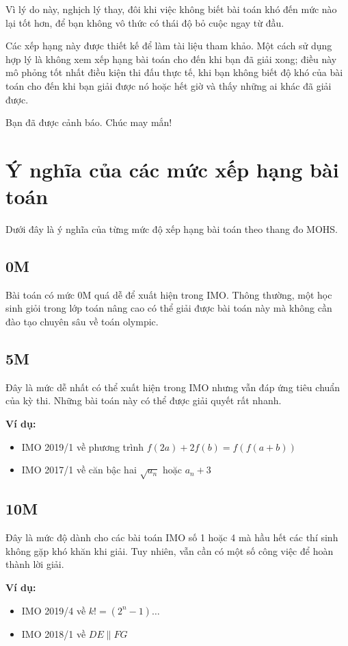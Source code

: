 \documentclass[../imo-training-open-book.tex]{subfiles}
\begin{document}
Vì lý do này, nghịch lý thay, đôi khi việc không biết bài toán khó đến mức nào lại tốt hơn,
để bạn không vô thức có thái độ bỏ cuộc ngay từ đầu.

Các xếp hạng này được thiết kế để làm tài liệu tham khảo. Một cách sử dụng hợp lý là không xem xếp hạng bài toán cho đến khi bạn đã giải xong;
điều này mô phỏng tốt nhất điều kiện thi đấu thực tế,
khi bạn không biết độ khó của bài toán cho đến khi bạn giải được nó hoặc hết giờ và thấy những ai khác đã giải được.

Bạn đã được cảnh báo. Chúc may mắn!

\section*{Ý nghĩa của các mức xếp hạng bài toán}

Dưới đây là ý nghĩa của từng mức độ xếp hạng bài toán theo thang đo MOHS.

\subsection*{0M}
\label{app:0M}
Bài toán có mức 0M quá dễ để xuất hiện trong IMO. Thông thường, một học sinh giỏi trong lớp toán nâng cao có thể giải được bài toán này mà không cần đào tạo chuyên sâu về toán olympic.

\subsection*{5M}
\label{app:5M}
Đây là mức dễ nhất có thể xuất hiện trong IMO nhưng vẫn đáp ứng tiêu chuẩn của kỳ thi. Những bài toán này có thể được giải quyết rất nhanh.

\textbf{Ví dụ:}
\begin{itemize}
    \item IMO 2019/1 về phương trình $f(2a) + 2f(b) = f(f(a + b))$
    \item IMO 2017/1 về căn bậc hai $\sqrt{a_n}$ hoặc $a_n + 3$
\end{itemize}

\subsection*{10M}
\label{app:10M}
Đây là mức độ dành cho các bài toán IMO số 1 hoặc 4 mà hầu hết các thí sinh không gặp khó khăn khi giải. Tuy nhiên, vẫn cần có một số công việc để hoàn thành lời giải.

\textbf{Ví dụ:}
\begin{itemize}
    \item IMO 2019/4 về $k! = (2^n-1)\ldots$
    \item IMO 2018/1 về $DE \parallel FG$
\end{itemize}
\end{document}
